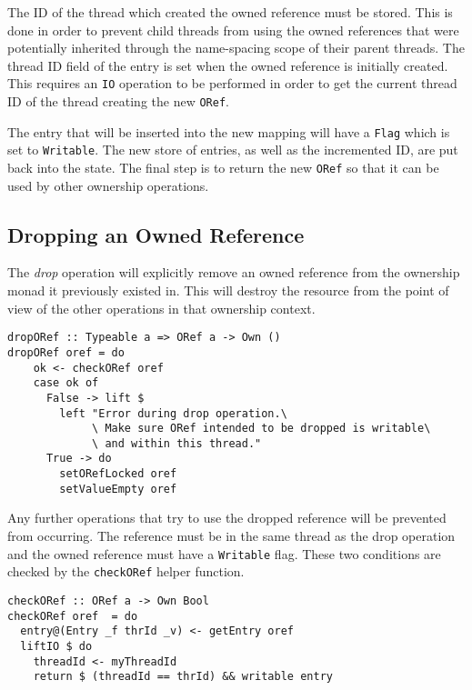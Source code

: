 \documentclass[onehalf,11pt]{beavtex}
\begin{document}
The ID of the thread which created the owned reference must be stored.
This is done in order to prevent child threads from using the owned
references that were potentially inherited through the name-spacing scope of
their parent threads.  The thread ID field of the entry is set when the owned
reference is initially created. This requires an \texttt{IO} operation to be
performed in order to get the current thread ID of the thread creating the
new \texttt{ORef}.

The entry that will be inserted into the new mapping will have a \texttt{Flag}
which is set to \texttt{Writable}.
The new store of entries, as well as the incremented ID, are put back into the
state.
The final step is to return the new \texttt{ORef} so that it can be used by other
ownership operations.

\subsection{Dropping an Owned Reference}

The \textit{drop} operation will explicitly remove an owned reference from the
ownership monad it previously existed in.
This will destroy the resource from the point of view of the other operations
in that ownership context.

\begin{verbatim}
dropORef :: Typeable a => ORef a -> Own ()
dropORef oref = do
    ok <- checkORef oref
    case ok of
      False -> lift $
        left "Error during drop operation.\
             \ Make sure ORef intended to be dropped is writable\
             \ and within this thread."
      True -> do
        setORefLocked oref
        setValueEmpty oref
\end{verbatim}

Any further operations that try to use the dropped reference will be prevented
from occurring.
The reference must be in the same thread as the drop operation and the owned
reference must have a \texttt{Writable} flag. These two conditions are checked
by the \texttt{checkORef} helper function.

\begin{verbatim}
checkORef :: ORef a -> Own Bool
checkORef oref  = do
  entry@(Entry _f thrId _v) <- getEntry oref
  liftIO $ do
    threadId <- myThreadId
    return $ (threadId == thrId) && writable entry
\end{verbatim}
\end{document}
